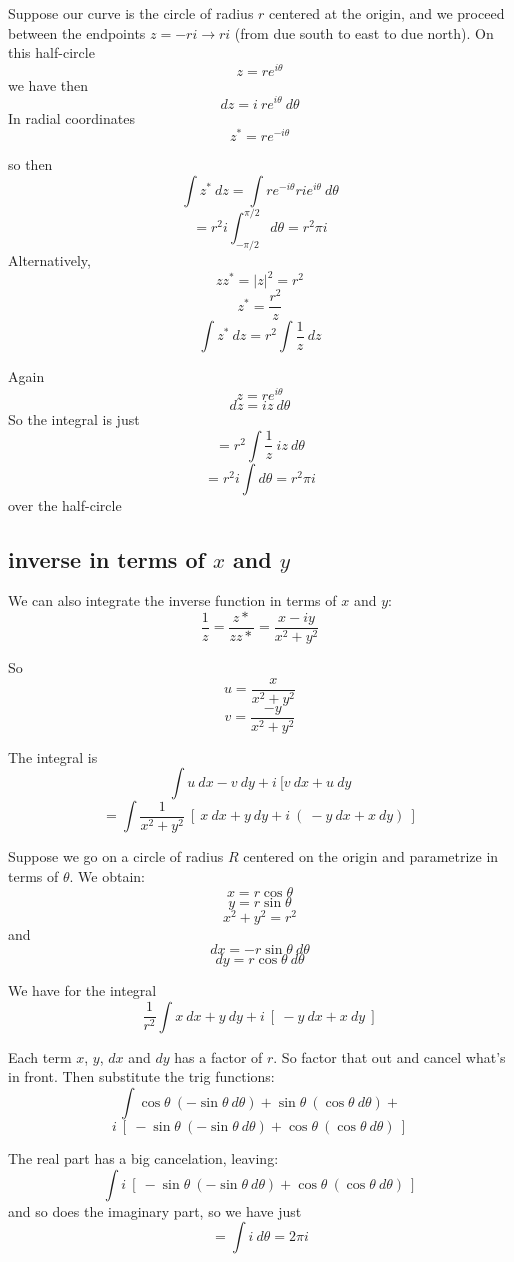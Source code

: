 \documentclass[11pt, oneside]{article}
\begin{document}
Suppose our curve is the circle of radius $r$ centered at the origin, and we proceed between the endpoints $z = -ri \rightarrow ri$ (from due south to east to due north).  On this half-circle 
\[ z = re^{i \theta} \]
we have then
\[ dz = i \ re^{i \theta} \ d \theta \]
In radial coordinates
\[ z^* = re^{-i\theta} \]

so then
\[ \int {z^*} \ dz = \int r e^{-i\theta} r i e^{i \theta} \ d \theta \]
\[ = r^2 i \int_{-\pi/2}^{\pi/2} d \theta = r^2 \pi i \]
Alternatively,
\[ zz^* = |z|^2 = r^2  \]
\[ z^* = \frac{r^2}{z} \]
\[ \int {z^*} \ dz = r^2 \int \frac{1}{z} \ dz \]

Again
\[ z = re^{i \theta} \]
\[ dz = iz \ d \theta \]
So the integral is just
\[ = r^2 \int \frac{1}{z} \ iz \ d \theta   \]
\[ = r^2 i \int d \theta = r^2 \pi i \]
over the half-circle

\subsection*{inverse in terms of $x$ and $y$}

We can also integrate the inverse function in terms of $x$ and $y$:
\[ \frac{1}{z} = \frac{z*}{zz*} = \frac{x - iy}{x^2 + y^2} \]

So
\[ u = \frac{x}{x^2 + y^2} \]
\[ v =  \frac{-y}{x^2 + y^2} \]

The integral is
\[ \int u \ dx - v \ dy + i \ [ v \ dx + u \ dy \] 
\[ = \int \frac{1}{x^2+y^2} \ [ \  x \ dx + y \ dy + i \ ( \ -y \ dx + x \ dy) \ ] \]

Suppose we go on a circle of radius $R$ centered on the origin and parametrize in terms of $\theta$.  We obtain:
\[ x = r \cos \theta \]
\[ y = r \sin \theta \]
\[ x^2 + y^2 = r^2 \]
and
\[ dx = - r \sin \theta \ d \theta \]
\[ dy = r \cos \theta \ d \theta \]

We have for the integral
\[ \frac{1}{r^2} \int x \ dx + y \ dy + i \ [ \ -y \ dx + x \ dy \ ] \]

Each term $x$, $y$, $dx$ and $dy$ has a factor of $r$.  So factor that out and cancel what's in front.  Then substitute the trig functions:
\[ \int \cos \theta \ (- \sin \theta \ d \theta) + \sin \theta \ (\cos \theta \ d \theta) + \]
\[ i \ [ \ - \sin \theta \ (- \sin \theta \ d \theta) + \cos \theta \ (\cos \theta \ d \theta)\ ] \]

The real part has a big cancelation, leaving:
\[ \int   i \ [ \ - \sin \theta \ (- \sin \theta \ d \theta) + \cos \theta \ (\cos \theta \ d \theta)\ ]\]
and so does the imaginary part, so we have just
\[ = \int i \ d \theta = 2 \pi i \]
\end{document}
